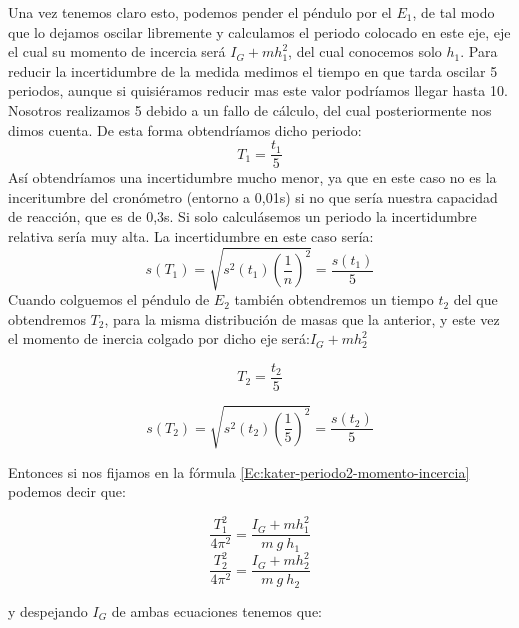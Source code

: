 \documentclass[12pt,a4paper]{book}
\begin{document}
Una vez tenemos claro esto, podemos pender el péndulo por el $E_1$, de tal modo que lo dejamos oscilar libremente y calculamos el periodo colocado en este eje, eje el cual su momento de incercia será $I_G + mh_1^2$, del cual conocemos solo $h_1$. Para reducir la incertidumbre de la medida medimos  el tiempo en que tarda oscilar 5 periodos, aunque si quisiéramos reducir mas este valor podríamos llegar hasta 10. Nosotros realizamos 5 debido a un fallo de cálculo, del cual posteriormente nos dimos cuenta. De esta forma obtendríamos dicho periodo:
\begin{equation}
T_1=\dfrac{t_1}{5}
\label{Ec: kater valor del periodo 1 kater}
\end{equation}
Así obtendríamos una incertidumbre mucho menor, ya que en este caso no es la inceritumbre del cronómetro (entorno a 0,01s) si no que sería nuestra capacidad de reacción, que es de 0,3s. Si solo calculásemos un periodo la incertidumbre relativa sería muy alta. La incertidumbre en este caso sería:
\begin{equation}
s(T_1)=\sqrt{s^2(t_1)(\dfrac{1}{n})^2}=\dfrac{s(t_1)}{5}
\label{Ec: valor del periodo 1 incertidumbre kater}
\end{equation}
Cuando colguemos el péndulo de $E_2$ también obtendremos un tiempo $t_2$ del que obtendremos $T_2$, para la misma distribución de masas que la anterior, y este vez el momento de inercia colgado por dicho eje será:$I_G+mh_2^2$

\begin{equation}
T_2=\dfrac{t_2}{5}
\label{Ec: valor del periodo 2 kater}
\end{equation}

\begin{equation}
s(T_2)=\sqrt{s^2(t_2)(\dfrac{1}{5})^2}=\dfrac{s(t_2)}{5}
\label{Ec: valor del periodo 2 incertidumbre kater}
\end{equation}

Entonces si nos fijamos en la fórmula \ref{Ec:kater-periodo2-momento-incercia} podemos decir que:

\begin{equation}
\dfrac{T_1^2}{4 \pi^2}=\dfrac{I_G+mh_1^2}{m \ g \ h_1}
\label{Ec:kater-periodo2-momento-incercia-1}
\end{equation}
\begin{equation}
\dfrac{T_2^2}{4 \pi^2}=\dfrac{I_G+mh_2^2}{m \ g \ h_2}
\label{Ec:kater-periodo2-momento-incercia-2}
\end{equation}

y despejando $I_G$ de ambas ecuaciones tenemos que: 
\end{document}
